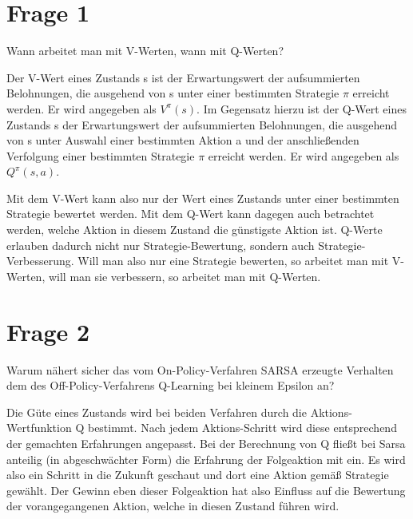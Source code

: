 \documentclass[10pt]{scrartcl}
\author{Steffen Brauer, André Harms,\\ Florian Johannßen, Jan-Christoph Meier,\\ Florian Ocker, Olaf Potratz,\\ Torben Woggan}
\title{\titletext}
\date{10.06.2012}
\begin{document}
\maketitle

\setcounter{tocdepth}{3}
\tableofcontents

	\listoffigures  
\newpage
\section{Frage 1}
Wann arbeitet man mit V-Werten, wann mit Q-Werten?

Der V-Wert eines Zustands s ist der Erwartungswert der aufsummierten Belohnungen, die ausgehend von s unter einer bestimmten Strategie $\pi$ erreicht werden. Er wird angegeben als $V^{\pi}(s)$. Im Gegensatz hierzu ist der Q-Wert eines Zustands s der Erwartungswert der aufsummierten Belohnungen, die ausgehend von s unter Auswahl einer bestimmten Aktion a und der anschließenden Verfolgung einer bestimmten Strategie $\pi$ erreicht werden. Er wird angegeben als $Q^{\pi}(s,a)$.

Mit dem V-Wert kann also nur der Wert eines Zustands unter einer bestimmten Strategie bewertet werden. Mit dem Q-Wert kann dagegen auch betrachtet werden, welche Aktion in diesem Zustand die günstigste Aktion ist. Q-Werte erlauben dadurch nicht nur Strategie-Bewertung, sondern auch Strategie-Verbesserung. Will man also nur eine Strategie bewerten, so arbeitet man mit V-Werten, will man sie verbessern, so arbeitet man mit Q-Werten.

\section{Frage 2}
Warum nähert sicher das vom On-Policy-Verfahren SARSA erzeugte Verhalten dem des Off-Policy-Verfahrens Q-Learning bei kleinem Epsilon an?

Die Güte eines Zustands wird bei beiden Verfahren durch die Aktions-Wertfunktion Q bestimmt. Nach jedem Aktions-Schritt wird diese entsprechend der gemachten Erfahrungen angepasst. Bei der Berechnung von Q fließt bei Sarsa anteilig (in abgeschwächter Form) die Erfahrung der Folgeaktion mit ein. Es wird also ein Schritt in die Zukunft geschaut und dort eine Aktion gemäß Strategie gewählt. Der Gewinn eben dieser Folgeaktion hat also Einfluss auf die Bewertung der vorangegangenen Aktion, welche in diesen Zustand führen wird. 
\end{document}
